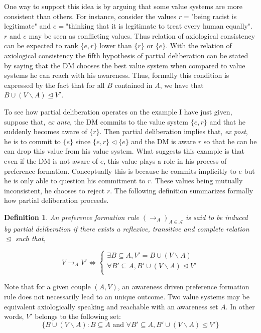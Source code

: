 \documentclass[11pt]{article}
\newtheorem{definition}{Definition}
\begin{document}
One way to support this idea is by arguing that some value systems are more consistent than others. For instance, consider the values $r=$"being racist is legitimate" and $e=$"thinking that it is legitimate to treat every human equally". $r$ and $e$ may be seen as conflicting values. Thus relation of axiological consistency can be expected to rank $\{e,r\}$ lower than $\{r\}$ or $\{e\}$. With the relation of axiological consistency the fifth hypothesis of partial deliberation can be stated by saying that the DM chooses the best value system when compared to value systems he can reach with his awareness. Thus, formally this condition is expressed by the fact that for all $B$ contained in $A$, we have that $ B\cup (V\backslash A)\trianglelefteq V'$.

To see how partial deliberation operates on the example I have just given, suppose that, \textit{ex ante}, the DM commits to the value system $\{e,r\}$ and that he suddenly becomes aware of $\{r\}$. Then partial deliberation implies that, \textit{ex post}, he is to commit to $\{e\}$ since  $\{e,r\}\triangleleft  \{e\}$ and the DM is aware $r$ so that he can he can drop this value from his value system. What suggests this example is that even if the DM is not aware of $e$, this value plays a role in his process of preference formation. Conceptually this is because he commits implicitly to $e$ but he is only able to question his commitment to $r$. These values being mutually inconsistent, he chooses to reject $r$. 
The following definition summarizes formally how partial deliberation proceeds. 


\begin{definition}
An preference formation rule $(\rightarrow_{A})_{A\in\mathcal{A}}$ is said to be induced by partial deliberation if there exists a reflexive, transitive and complete relation $\trianglelefteq$ such that, 




\begin{equation}
 V\rightarrow_{A} V'\iff  \left\{
      \begin{aligned}
         \exists B\subseteq A, V'=B\cup (V\backslash A)\\
       \forall B'\subseteq A,   B'\cup (V\backslash A)\trianglelefteq V'\\      
      \end{aligned}
    \right.
    \label{TH1}
\end{equation}
\end{definition}
Note that for a given couple $(A, V)$, an awareness driven preference formation rule does not necessarily lead to an unique outcome. Two value systems may be equivalent axiologically speaking and reachable with an awareness set $A$. In other words, $V'$ belongs to the following set: 
\[
\{B\cup (V\backslash A): B\subseteq A\mbox{ and } \forall B'\subseteq A,   B'\cup (V\backslash A)\trianglelefteq V'\}
\]
\end{document}
